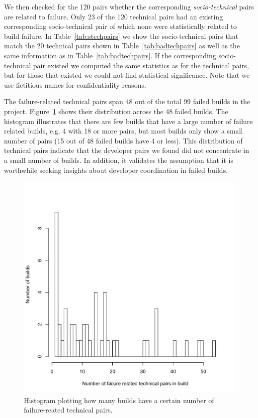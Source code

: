 We then checked for the 120 pairs whether the corresponding \emph{socio-technical} pairs are related to failure.
Only 23 of the 120 technical pairs had an existing corresponding socio-technical pair of which none were statistically related to build failure. 
In Table~\ref{tab:stechpairs} we show the socio-technical pairs that match the 20 technical pairs shown in Table~\ref{tab:badtechpairs} as well as the same information as in Table~\ref{tab:badtechpairs}.
If the corresponding socio-technical pair existed we computed the same statistics as for the technical pairs, but for those that existed we could not find statistical significance.
Note that we use fictitious names for confidentiality reasons.

The failure-related technical pairs span 48 out of the total 99 failed builds in
the project. Figure~\ref{fig:builddistribution} shows their distribution
 across the 48 failed builds. The histogram
illustrates that there are few builds that have a large number of failure related
builds, e.g. 4 with 18 or more pairs, but most builds only show a small number of
pairs (15 out of 48 failed builds have 4 or less). 
This distribution of technical pairs indicate that the developer
pairs we found  did not concentrate in a small number of builds. 
In addition, it validates the assumption that it is
worthwhile seeking insights about developer coordination in failed builds.


\begin{figure}[t]
\centering
\vspace{-1cm}
\includegraphics[width=\columnwidth]{figures/builddistribution}
\vspace{-.75cm}
\caption{Histogram plotting how many builds have a certain number of failure-reated technical pairs.}
\label{fig:builddistribution}
\end{figure}

